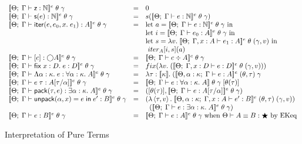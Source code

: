 \begin{figure}
\begin{displaymath}
\begin{array}{lcl}
    \interpE{\judgeE{\Gamma}{\z}{\N}}\;\theta\;\gamma
       & = & 
         0 
    \\
    \interpE{\judgeE{\Gamma}{\s{e}}{\N}}\;\theta\;\gamma
       & = & 
         s (\interpE{\judgeE{\Gamma}{e}{\N}}\;\theta\;\gamma)
    \\
    \interpE{\judgeE{\Gamma}{\iter{e}{e_0}{x}{e_1}}{A}}\;\theta\;\gamma
    &=& 
       \mbox{let } 
          a = \interpE{\judgeE{\Gamma}{e}{\N}}\;\theta\;\gamma  
       \mbox{ in}\\
    & &\mbox{let } 
          i = \interpE{\judgeE{\Gamma}{e_0}{A}}\;\theta\;\gamma
       \mbox{ in}\\
    & &\mbox{let } 
          s = \semfun{v}{\interpE{\judgeE{\Gamma,x:A}{e_1}{A}}\;\theta\;(\gamma,v)}  
       \mbox{ in}\\
    & &\mbox{ }iter_A[i, s](a)
   \\
   \interpE{\judgeE{\Gamma}{\comp{c}}{\monad{A}}}\;\theta\;\gamma
   & = & 
     \interpC{\judgeC{\Gamma}{c}{A}}\;\theta\;\gamma
   \\
   \interpE{\judgeE{\Gamma}{\fix{x:D}{e}}{D}}\;\theta\;\gamma
   & = & 
     fix(\semfun{v}{(\interpE{\judgeE{\Gamma, x:D}{e}{D}}\;\theta\;(\gamma,v))})
   \\
   \interpE{\judgeE{\Gamma}{\Fun{\alpha}{\kappa}{e}}
                           {\forall \alpha:\kappa.\; A}}\;\theta\;\gamma 
   & = & 
     \lambda \tau:\interp{\kappa}.\; 
        (\interpE{\judgeE[\Theta, \alpha:\kappa]{\Gamma}{e}{A}}\;(\theta, \tau)\;\gamma
   \\
   \interpE{\judgeE{\Gamma}{e\;\tau}{A[\tau/\alpha]}}\;\theta\;\gamma
   & = & 
     \interp{\judgeE{\Gamma}{e}{\forall \alpha:\kappa.\;A}}\;\theta\;\gamma\;
            [\theta(\tau)]
   \\
   \interpE{\judgeE{\Gamma}{\pack{\tau}{e}}{\exists \alpha:\kappa.\;A}}
           \;\theta\;\gamma
   & = & 
           ([\theta(\tau)], \interpE{\judgeE{\Gamma}{e}{A[\tau/\alpha]}}\;\theta\;\gamma)
   \\
   \interpE{\judgeE{\Gamma}{\unpack{\alpha}{x}{e}{e'}}{B}}\;\theta\;\gamma
   & = & 
   (\semfun{\pair{\tau}{v}}
           {\interpE{\judgeE[\Theta, \alpha:\kappa]{\Gamma, x:A}{e'}{B}}
                    \;(\theta, \tau)\;(\gamma,v)})
   \\
   & & \;\;
   (\interpE{\judgeE{\Gamma}{e}{\exists \alpha:\kappa.\;A}}\;\theta\;\gamma)
   \\
   \interpE{\judgeE{\Gamma}{e}{B}}\;\theta\;\gamma 
   & = & 
     \interpE{\judgeE{\Gamma}{e}{A}}\;\theta\;\gamma \mbox{ when } \judgeKeq{A}{B}{\bigstar}
     \mbox{ by EKeq}
   \\
  \end{array}
\end{displaymath}
\caption{Interpretation of Pure Terms}
\label{lang-pure-interp}
\end{figure}

